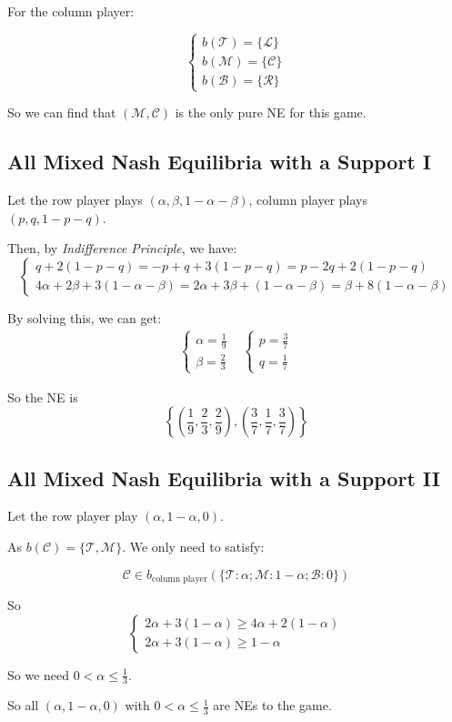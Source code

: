 \documentclass{article}
\begin{document}
    For the column player:

    $$
    \begin{cases}
        b(\mathcal{T}) = \{\mathcal{L}\}\\
        b(\mathcal{M}) = \{\mathcal{C}\}\\
        b(\mathcal{B}) = \{\mathcal{R}\}
    \end{cases}
    $$

    So we can find that $(\mathcal{M}, \mathcal{C})$ is the only pure NE for this game.

    \subsection{All Mixed Nash Equilibria with a Support I}

    Let the row player plays $(\alpha, \beta, 1-\alpha-\beta)$, column player plays $(p, q, 1-p-q)$.

    Then, by \textit{Indifference Principle}, we have:
    $$
    \begin{cases}
        q+2(1-p-q)=-p+q+3(1-p-q)=p-2q+2(1-p-q)\\
        4\alpha+2\beta+3(1-\alpha-\beta)=2\alpha+3\beta+(1-\alpha-\beta)=\beta+8(1-\alpha-\beta)
    \end{cases}
    $$

    By solving this, we can get:
    \begin{align*}
    \begin{cases}
        \alpha=\frac{1}{9}\\
        \beta=\frac{2}{3}
    \end{cases}&
        \begin{cases}
            p=\frac{3}{7}\\
            q=\frac{1}{7}
        \end{cases}
    \end{align*}

    So the NE is
    $$
    \left\{\left(\frac{1}{9}, \frac{2}{3}, \frac{2}{9}\right), \left(\frac{3}{7}, \frac{1}{7}, \frac{3}{7}\right)\right\}
    $$

    \subsection{All Mixed Nash Equilibria with a Support II}

    Let the row player play $(\alpha, 1-\alpha, 0)$.

    As $b(\mathcal{C})=\{\mathcal{T}, \mathcal{M}\}$. We only need to satisfy:

    $$
    \mathcal{C}\in b_{\text{column player}}(\{\mathcal{T}: \alpha; \mathcal{M}: 1-\alpha; \mathcal{B}: 0\})
    $$

    So
    $$
    \begin{cases}
        2\alpha+3(1-\alpha)\ge 4\alpha+2(1-\alpha)\\
        2\alpha+3(1-\alpha)\ge 1-\alpha
    \end{cases}
    $$

    So we need $0<\alpha\le \frac{1}{3}$.

    So all $(\alpha, 1-\alpha, 0)$ with $0<\alpha\le\frac{1}{3}$ are NEs to the game.
\end{document}
